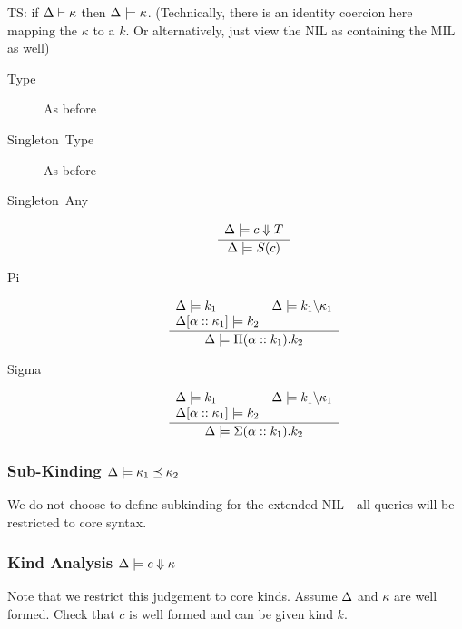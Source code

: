 \documentclass[12pt,twoside,fleqn]{amsart}
\theoremstyle{plain}
\theoremstyle{plain}
\theoremstyle{definition}
\begin{document}
TS: if \( \Delta  \vdash \kappa  \) then \( \Delta  \models \kappa  \).
(Technically, there is an identity coercion here mapping the \( \kappa  \)
to a \( k \). Or alternatively, just view the NIL as containing the MIL as
well)

\begin{description}
\item [Type]As before
\item [Singleton~Type]As before 
\item [Singleton~Any]
\[
\frac{\begin{array}{ll}
\Delta  \models c \Downarrow T
\end{array} }{\Delta  \models S(c) }\]

\item [Pi]
\[
\frac{\begin{array}{ll}
\Delta  \models k_{1} & \Delta  \models k_{1} \backslash \kappa _{1}\\
\Delta  [\alpha   ::\kappa _{1}  ] \models k_{2} & 
\end{array} }{\Delta  \models \Pi (\alpha ::k_{1}).k_{2} }\]

\item [Sigma]
\[
\frac{\begin{array}{ll}
\Delta  \models k_{1} & \Delta  \models k_{1} \backslash \kappa _{1}\\
\Delta  [\alpha   ::\kappa _{1}  ] \models k_{2} & 
\end{array} }{\Delta  \models \Sigma (\alpha ::k_{1}).k_{2} }\]

\end{description}

\subsubsection{Sub-Kinding \protect\( \Delta  \models \kappa _{1} \preceq \kappa _{2}\protect \)}

We do not choose to define subkinding for the extended NIL - all queries will
be restricted to core syntax.


\subsubsection{Kind Analysis \protect\( \Delta  \models c \Downarrow \kappa \protect \)}

Note that we restrict this judgement to core kinds. Assume \( \Delta  \)
and \( \kappa  \) are well formed. Check that \( c \) is well formed and can
be given kind \( k \).
\end{document}
